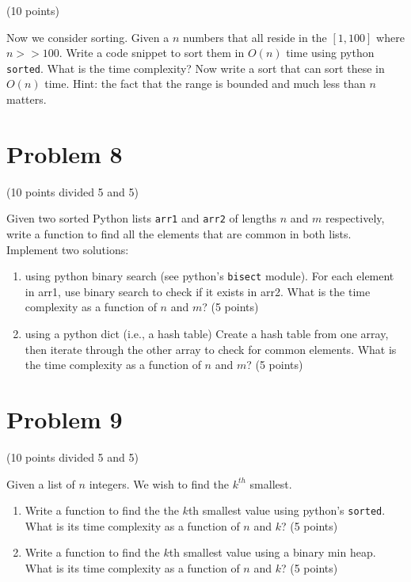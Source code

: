\documentclass{article}
\begin{document}
(10 points)

Now we consider sorting.  Given a $n$ numbers that all reside in the
$[1,100]$ where $n >> 100$.  Write a code snippet to sort them in $O(n)$
time using python \verb|sorted|.  What is the time complexity?  Now
write a sort that can sort these in $O(n)$ time. Hint: the fact that the
range is bounded and much less than $n$ matters.


\section{Problem 8} (10 points divided 5 and 5)

Given two sorted Python lists \verb|arr1| and \verb|arr2| of lengths
$n$ and $m$ respectively, write a function to find all the elements
that are common in both lists. Implement two solutions:

\begin{enumerate}[label=(\alph*)]

\item using python binary search (see python's \verb|bisect| module).  For each element in arr1, use binary search to check if it exists in arr2.  What is
  the time complexity as a function of $n$ and $m$? (5 points)

\item using a python dict (i.e., a hash table) Create a hash table from one array, then iterate through the other array to check for common elements.  What
  is the time complexity as a function of $n$ and $m$? (5 points)

\end{enumerate}

\section{Problem 9}

(10 points divided 5 and 5)

Given a list of $n$ integers.  We wish to find the $k^{th}$ smallest.

\begin{enumerate}[label=(\alph*)]
\item Write a function to find the the $k$th 
  smallest value using python's \verb|sorted|.  What is its time complexity
  as a function of $n$ and $k$? (5 points)

\item Write a function to find the $k$th smallest value using a binary
  min heap.  What is its time complexity as a function of $n$ and $k$?
  (5 points)

\end{enumerate}
\end{document}
